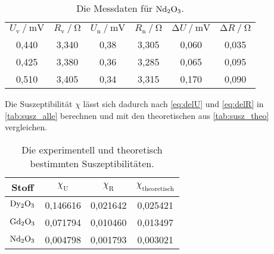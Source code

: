 \begin{table}[H]
  \centering
  \caption{Die Messdaten für $\ce{Nd2O3}$.}
  \label{tab:nd}
  \begin{tabular}{c c c c c c}
    \toprule 
    
    \multicolumn{1}{c}{$U_\text{v} \mathbin{/} \unit{\milli\volt}$} &
    \multicolumn{1}{c}{$R_\text{v} \mathbin{/} \unit{\ohm} $} &
    \multicolumn{1}{c}{$U_\text{n} \mathbin{/} \unit{\milli\volt}$} &
    \multicolumn{1}{c}{$R_\text{n} \mathbin{/} \unit{\ohm}$}& 
    \multicolumn{1}{c}{$\increment U \mathbin{/} \unit{\milli\volt}$}&
    \multicolumn{1}{c}{$\increment R \mathbin{/} \unit{\ohm}$} \\

    \cmidrule(lr){1-2} \cmidrule(lr){3-4} \cmidrule(lr){5-6}

    0,440 & 3,340 & 0,38 & 3,305 &   0,060 &   0,035 \\
    0,425 & 3,380 & 0,36 & 3,285 &   0,065 &   0,095 \\
    0,510 & 3,405 & 0,34 & 3,315 &   0,170 &   0,090 \\
    \bottomrule
  \end{tabular} 
\end{table}

Die Suszeptibilität $\chi$ lässt sich dadurch nach \autoref{eq:delU} und \autoref{eq:delR} in \autoref{tab:susz_alle} berechnen
und mit den theoretischen aus \autoref{tab:susz_theo} vergleichen.
\begin{table}
  \centering
  \caption{Die experimentell und theoretisch bestimmten Suszeptibilitäten.}
  \label{tab:susz_alle}
  \begin{tabular}{c c c c}
    \toprule
    Stoff &    
    $\chi_\text{U}$ &
    $\chi_\text{R}$ &
    $\chi_\text{theoretisch}$ \\
    \midrule
    $\ce{Dy2O3}$ & 0,146616 & 0,021642 &   0,025421 \\
    $\ce{Gd2O3}$ & 0,071794 & 0,010460 &   0,013497 \\
    $\ce{Nd2O3}$ & 0,004798 & 0,001793 &   0,003021 \\
    \bottomrule
  \end{tabular}
\end{table}